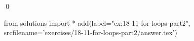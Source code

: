 
\begin{ex}
  \label{ex:18-11-for-loops-part2}
  
  \qed
\end{ex}
\begin{python0}
from solutions import *
add(label="ex:18-11-for-loops-part2",
    srcfilename='exercises/18-11-for-loops-part2/answer.tex')
\end{python0}
